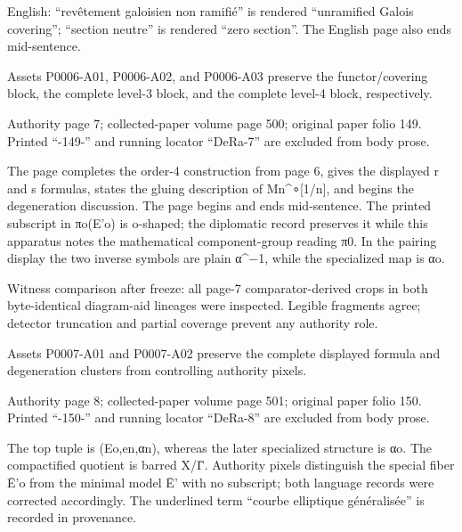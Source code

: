 \documentclass[11pt,a4paper]{article}
\begin{document}
English: “revêtement galoisien non ramifié” is rendered “unramified Galois covering”; “section neutre” is rendered “zero section”. The English page also ends mid-sentence.

Assets P0006-A01, P0006-A02, and P0006-A03 preserve the functor/covering block, the complete level-3 block, and the complete level-4 block, respectively.


\par\medskip
\hypertarget{D018-P0007}{}
\par\smallskip
Authority page 7; collected-paper volume page 500; original paper folio 149. Printed “-149-” and running locator “DeRa-7” are excluded from body prose.

The page completes the order-4 construction from page 6, gives the displayed r and s formulas, states the gluing description of M\textunderscore{}n\textasciicircum{}∘[1/n], and begins the degeneration discussion. The page begins and ends mid-sentence. The printed subscript in π\textunderscore{}o(E'\textunderscore{}o) is o-shaped; the diplomatic record preserves it while this apparatus notes the mathematical component-group reading π\textunderscore{}0. In the pairing display the two inverse symbols are plain α\textasciicircum{}−1, while the specialized map is α\textunderscore{}o.

Witness comparison after freeze: all page-7 comparator-derived crops in both byte-identical diagram-aid lineages were inspected. Legible fragments agree; detector truncation and partial coverage prevent any authority role.

Assets P0007-A01 and P0007-A02 preserve the complete displayed formula and degeneration clusters from controlling authority pixels.


\par\medskip
\hypertarget{D018-P0008}{}
\par\smallskip
Authority page 8; collected-paper volume page 501; original paper folio 150. Printed “-150-” and running locator “DeRa-8” are excluded from body prose.

The top tuple is (E\textunderscore{}o,e\textunderscore{}n,α\textunderscore{}n), whereas the later specialized structure is α\textunderscore{}o. The compactified quotient is barred X/Γ̄. Authority pixels distinguish the special fiber Ē'\textunderscore{}o from the minimal model Ē' with no subscript; both language records were corrected accordingly. The underlined term “courbe elliptique généralisée” is recorded in provenance.
\end{document}
